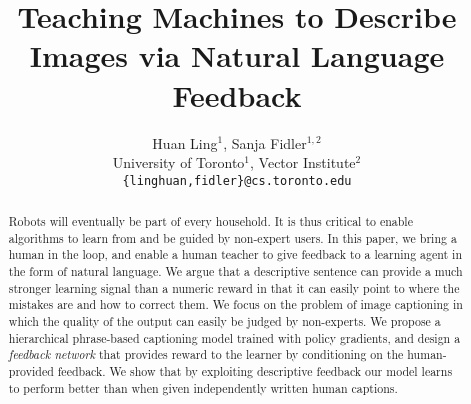 \documentclass{article}
\title{Teaching Machines to Describe Images via Natural Language Feedback}
\author{
  Huan Ling$^1$, Sanja Fidler$^{1,2}$ \\
  University of Toronto$^1$, Vector Institute$^{2}$\\
  \texttt{\{linghuan,fidler\}@cs.toronto.edu} \\
}
\begin{document}

\maketitle

\vspace{-2.5mm}
\begin{abstract}
 
 Robots will eventually be part of every household. 
It is thus critical to enable algorithms to learn from and be guided by non-expert users. In this paper, we bring a human in the loop, and enable a human teacher to give feedback to a learning agent in the form of natural language. We argue that a descriptive sentence can provide a much stronger learning signal than a numeric reward in that it can easily point to where the mistakes are and how to correct them. We focus on the problem of image captioning in which the quality of the output can easily be judged by non-experts.  We propose a hierarchical phrase-based captioning model trained with policy gradients, and design a \emph{feedback network} that provides reward to the learner by conditioning on the human-provided feedback. We show  that by exploiting descriptive feedback our model learns to perform better than when given independently written human captions. 

\end{abstract}







\end{document}
